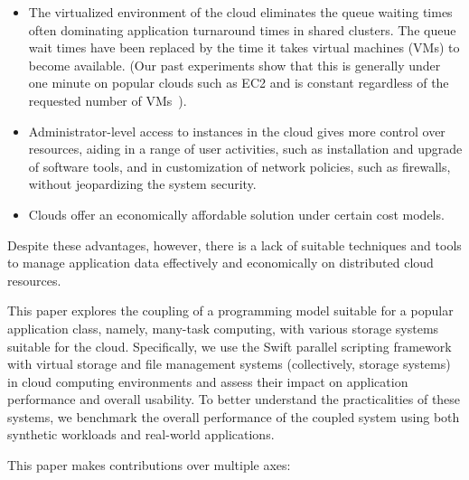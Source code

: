 \documentclass[10pt,journal,cspaper,compsoc]{IEEEtran}
\begin{document}
\begin{itemize}
\item The virtualized environment of the cloud eliminates the queue waiting times
often dominating application turnaround times in shared clusters.
The queue wait times have been replaced by the time it takes virtual machines (VMs) to become
available. (Our past experiments show that this is generally under one minute
on popular clouds such as EC2 and is constant regardless of the requested
number of VMs~\cite{swift13}).

\item Administrator-level access to instances in the cloud gives more control over
resources, aiding in a range of user activities, such as installation and
upgrade of software tools, and in customization of network policies, such as
firewalls, without jeopardizing the system security.

\item Clouds offer an economically affordable solution under certain cost models. 
\end{itemize}

Despite these advantages, however, there is a lack of suitable techniques and
tools to manage application data effectively and economically on distributed
cloud resources.

This paper explores the coupling of a programming model suitable for a popular
application class, namely, many-task computing, with various storage
systems suitable for the cloud. Specifically, we use the Swift
parallel scripting framework with virtual storage and file management systems
(collectively, storage systems) in cloud computing environments and
assess their impact on application performance and overall usability. To better
understand the practicalities of these systems, we benchmark the overall
performance of the coupled system using both synthetic workloads and real-world
applications.

This paper makes contributions over multiple axes: 
\end{document}
